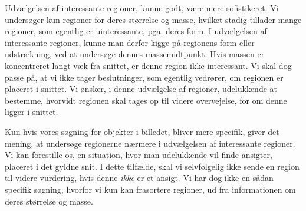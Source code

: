Udvælgelsen af interessante regioner, kunne godt, være mere
sofistikeret.  Vi undersøger kun regioner for deres størrelse og masse,
hvilket stadig tillader mange regioner, som egentlig er uinteressante,
pga. deres form.  I udvælgelsen af interessante regioner, kunne man
derfor kigge på regionens form eller udstrækning, ved at undersøge
dennes massemidtpunkt.  Hvis massen er koncentreret langt væk fra
snittet, er denne region ikke interessant. Vi skal dog passe på, at vi
ikke tager beslutninger, som egentlig vedrører, om regionen er placeret
i snittet. Vi ønsker, i denne udvælgelse af regioner, udelukkende at
bestemme, hvorvidt regionen skal tages op til videre overvejelse, for om
denne ligger i snittet.

Kun hvis vores søgning for objekter i billedet, bliver mere specifik,
giver det mening, at undersøge regionerne nærmere i udvælgelsen af
interessante regioner. Vi kan forestille os, en situation, hvor man
udelukkende vil finde ansigter, placeret i det gyldne snit. I dette
tilfælde, skal vi selvfølgelig ikke sende en region til videre
vurdering, hvis denne \emph{ikke} er et ansigt. Vi har dog ikke en sådan
specifik søgning, hvorfor vi kun kan frasortere regioner, ud fra
informationen om deres størrelse og masse.


